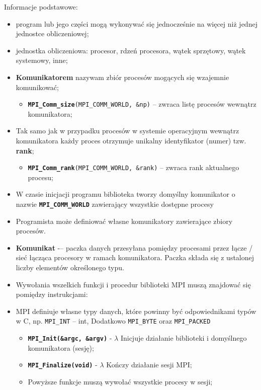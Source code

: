 Informacje podstawowe: 
\begin{itemize}
\item program lub jego części mogą wykonywać się jednocześnie na więcej niż jednej jednostce obliczeniowej;
\item jednostka obliczeniowa: procesor, rdzeń procesora, wątek sprzętowy, wątek systemowy, inne;
\item \textbf{Komunikatorem} nazywam zbiór procesów mogących się wzajemnie komunikować;
\begin{itemize}
\item \texttt{\textbf{MPI\_Comm\_size}(MPI\_COMM\_WORLD, \&np)} – zwraca listę procesów wewnątrz komunikatora;
\end{itemize}
\item Tak samo jak w przypadku procesów w systemie operacyjnym wewnątrz komunikatora każdy proces otrzymuje unikalny identyfikator (numer) tzw. \textbf{rank};
\begin{itemize}
\item \texttt{\textbf{MPI\_Comm\_rank}(MPI\_COMM\_WORLD, \&rank)} – zwraca rank aktualnego procesu;
\end{itemize}
\item W czasie inicjacji programu biblioteka tworzy domyślny komunikator o nazwie \texttt{\textbf{MPI\_COMM\_WORLD}} zawierający wszystkie dostępne procesy
\item Programista może definiować własne komunikatory zawierające zbiory procesów.
\item \textbf{Komunikat} -– paczka danych przesyłana pomiędzy procesami przez łącze / sieć łącząca procesory w ramach komunikatora. Paczka składa się z ustalonej liczby elementów określonego typu.
\item Wywołania wszelkich funkcji i procedur biblioteki MPI muszą znajdować się pomiędzy instrukcjami:
\item MPI definiuje własne typy danych, które powinny być odpowiednikami typów w C, np. \texttt{MPI\_INT} – int, Dodatkowo \texttt{MPI\_BYTE} oraz \texttt{MPI\_PACKED}
\begin{itemize}
\item \texttt{\textbf{MPI\_Init(\&argc, \&argv)}} - $\lambda$ Inicjuje działanie biblioteki i domyślnego komunikatora (sesję);
\item \texttt{\textbf{MPI\_Finalize(void)}} - $\lambda$ Kończy działanie sesji MPI;
\item Powyższe funkcje muszą wywołać wszystkie procesy w sesji;
\end{itemize}
\end{itemize}

